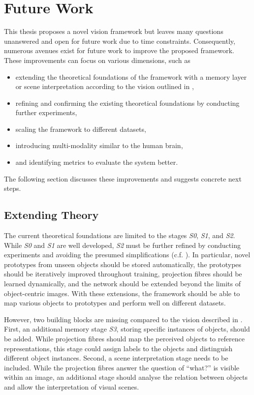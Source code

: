 \section{Future Work}
This thesis proposes a novel vision framework but leaves many questions unanswered and open for future work due to time constraints.
Consequently, numerous avenues exist for future work to improve the proposed framework.
These improvements can focus on various dimensions, such as
\begin{itemize}
    \item extending the theoretical foundations of the framework with a memory layer or scene interpretation according to the vision outlined in ,
    \item refining and confirming the existing theoretical foundations by conducting further experiments,
    \item scaling the framework to different datasets,
    \item introducing multi-modality similar to the human brain,
    \item and identifying metrics to evaluate the system better.
\end{itemize}

The following section discusses these improvements and suggests concrete next steps.

\subsection{Extending Theory}
The current theoretical foundations are limited to the stages \emph{S0}, \emph{S1}, and \emph{S2}.
While \emph{S0} and \emph{S1} are well developed, \emph{S2} must be further refined by conducting experiments and avoiding the presumed simplifications (c.f. ).
In particular, novel prototypes from unseen objects should be stored automatically, the prototypes should be iteratively improved throughout training, projection fibres should be learned dynamically, and the network should be extended beyond the limits of object-centric images.
With these extensions, the framework should be able to map various objects to prototypes and perform well on different datasets.

However, two building blocks are missing compared to the vision described in . First, an additional memory stage \emph{S3}, storing specific instances of objects, should be added. While projection fibres should map the perceived objects to reference representations, this stage could assign labels to the objects and distinguish different object instances.
Second, a scene interpretation stage needs to be included. While the projection fibres answer the question of ``what?'' is visible within an image, an additional stage should analyse the relation between objects and allow the interpretation of visual scenes.


